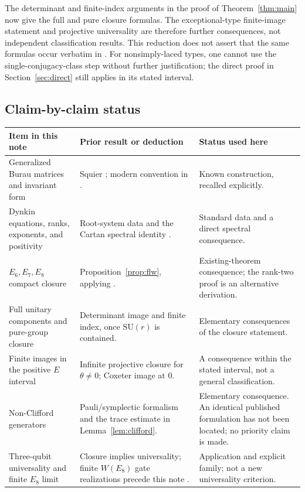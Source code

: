 \documentclass[11pt,a4paper]{article}
\theoremstyle{remark}\newtheorem{remark}[theorem]{Remark}
\newcommand{\SU}{\mathrm {SU}}
\begin{document}
The determinant and finite-index arguments in the proof of
Theorem~\ref{thm:main} now give the full and pure closure formulas.
The exceptional-type finite-image statement and projective universality
are therefore further consequences, not independent classification
results.  This reduction does not assert that the same formulas occur
verbatim in \cite{FLW}.  For nonsimply-laced types, one cannot use the
single-conjugacy-class step without further justification; the direct
proof in Section~\ref{sec:direct} still applies in its stated interval.

\subsection*{Claim-by-claim status}
\renewcommand{\arraystretch}{1.13}
\begin{longtable}{@{}p{}p{}p{}@{}}
\toprule
Item in this note & Prior result or deduction & Status used here\\
\midrule\endhead
Generalized Burau matrices and invariant form & Squier \cite{Squier}; modern convention in \cite{BQ}. & Known construction, recalled explicitly.\\
Dynkin equations, ranks, exponents, and positivity & Root-system data and the Cartan spectral identity \cite{Etingof,Damianou}. & Standard data and a direct spectral consequence.\\
$E_6,E_7,E_8$ compact closure & Proposition~\ref{prop:flw}, applying \cite{FLW}. & Existing-theorem consequence; the rank-two proof is an alternative derivation.\\
Full unitary components and pure-group closure & Determinant image and finite index, once $\SU(r)$ is contained. & Elementary consequences of the closure statement.\\
Finite images in the positive $E$ interval & Infinite projective closure for $\theta\ne0$; Coxeter image at $0$. & A consequence within the stated interval, not a general classification.\\
Non-Clifford generators & Pauli/symplectic formalism \cite{DDM} and the trace estimate in Lemma~\ref{lem:clifford}. & Elementary consequence. An identical published formulation has not been located; no priority claim is made.\\
Three-qubit universality and finite $E_8$ limit & Closure implies universality; finite $W(E_8)$ gate realizations precede this note \cite{Planat,ARW}. & Application and explicit family; not a new universality criterion.\\

\end{longtable}
\end{document}
